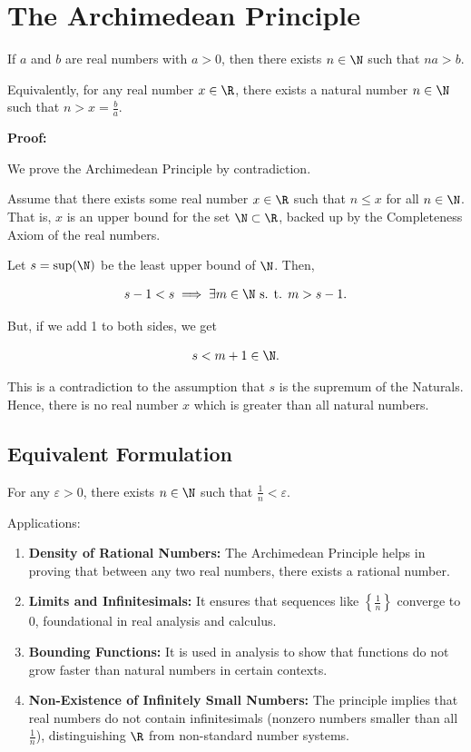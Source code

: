 \chapter{The Archimedean Principle}

If \(a\) and \(b\) are real numbers with \(a > 0\), then there exists \(n \in \N\) 
such that \(na > b\).

Equivalently, for any real number \( x \in \R \), there exists a natural number \( n \in \N \) such 
that \( n > x = \frac{b}{a} \). 

\textbf{Proof:}

We prove the Archimedean Principle by contradiction.

Assume that there exists some real number \( x \in \R \) such that \( n \leq x \) for all 
\( n \in \N \). That is, \(x\) is an upper bound for the set \( \N \subset \R\), backed up 
by the Completeness Axiom of the real numbers.

Let \( s = \sup(\N) \) be the least upper bound of \( \N \). Then, 

\[
	s - 1 < s \implies \exists m \in \N \text{ s. t. } m > s - 1.
\]

But, if we add 1 to both sides, we get

\[
	s < m + 1 \in \N.
\]

This is a contradiction to the assumption that \(s\) is the supremum of the Naturals. Hence, there 
is no real number \(x\) which is greater than all natural numbers.

\QED

\section{Equivalent Formulation}

For any \( \varepsilon > 0 \), there exists \( n \in \N \) such that \( \frac{1}{n} < \varepsilon \).

Applications:

\begin{enumerate}
	
	\item \textbf{Density of Rational Numbers:} The Archimedean Principle helps in proving that between 
		   any two real numbers, there exists a rational number.

	\item \textbf{Limits and Infinitesimals:} It ensures that sequences like 
	      \( \left\{ \frac{1}{n} \right\}\) converge to 0, foundational in real analysis and calculus.

	\item \textbf{Bounding Functions:} It is used in analysis to show that functions do not grow faster 
	      than natural numbers in certain contexts.

	\item \textbf{Non-Existence of Infinitely Small Numbers:} The principle implies that real numbers do 
	      not contain infinitesimals (nonzero numbers smaller than all \( \frac{1}{n} \)), distinguishing 
		  \( \R \) from non-standard number systems.

\end{enumerate}

